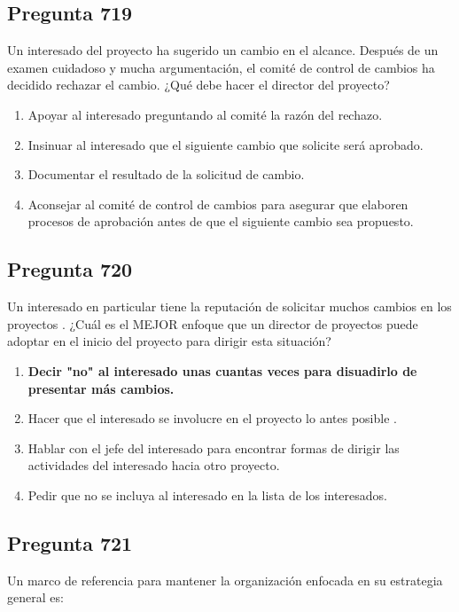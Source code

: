 \documentclass[11pt,a4paper]{article}
\begin{document}
\subsection*{Pregunta 719}
Un interesado del proyecto ha sugerido un cambio en el alcance. Después de un examen cuidadoso y mucha argumentación, el comité de control de cambios ha decidido rechazar el cambio. ¿Qué debe hacer el director del proyecto?

\begin{enumerate}[label=\alph*)]
  \item Apoyar al interesado preguntando al comité la razón del rechazo.
  \item Insinuar al interesado que el siguiente cambio que solicite será aprobado.
  \item Documentar el resultado de la solicitud de cambio.
  \item Aconsejar al comité de control de cambios para asegurar que elaboren procesos de aprobación antes de que el siguiente cambio sea propuesto.
\end{enumerate}

\subsection*{Pregunta 720}
Un interesado en particular tiene la reputación de solicitar muchos cambios en los proyectos . ¿Cuál es el MEJOR enfoque que un director de proyectos puede adoptar en el inicio del proyecto para dirigir esta situación?

\begin{enumerate}[label=\alph*)]
  \item \textbf{Decir "no" al interesado unas cuantas veces para disuadirlo de presentar más cambios.}
  \item Hacer que el interesado se involucre en el proyecto lo antes posible .
  \item Hablar con el jefe del interesado para encontrar formas de dirigir las actividades del interesado hacia otro proyecto.
  \item Pedir que no se incluya al interesado en la lista de los interesados.
\end{enumerate}

\subsection*{Pregunta 721}
Un marco de referencia para mantener la organización enfocada en su estrategia general es:
\end{document}
